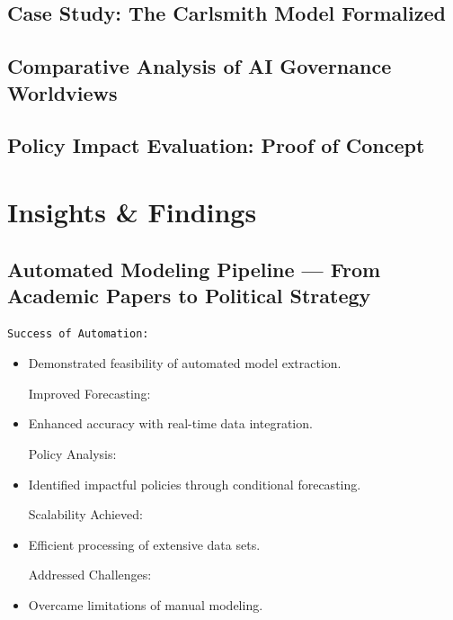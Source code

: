 \documentclass[
  letterpaper,
]{book}
\begin{document}
\subsection{Case Study: The Carlsmith Model
Formalized}\label{case-study-the-carlsmith-model-formalized}

\subsection{Comparative Analysis of AI Governance
Worldviews}\label{comparative-analysis-of-ai-governance-worldviews}

\subsection{Policy Impact Evaluation: Proof of
Concept}\label{policy-impact-evaluation-proof-of-concept}

\section{Insights \& Findings}\label{insights-findings}

\subsection{Automated Modeling Pipeline --- From Academic Papers to
Political
Strategy}\label{automated-modeling-pipeline-from-academic-papers-to-political-strategy}

\begin{verbatim}
Success of Automation:
\end{verbatim}

\begin{itemize}
\item
  Demonstrated feasibility of automated model extraction.

  Improved Forecasting:
\item
  Enhanced accuracy with real-time data integration.

  Policy Analysis:
\item
  Identified impactful policies through conditional forecasting.

  Scalability Achieved:
\item
  Efficient processing of extensive data sets.

  Addressed Challenges:
\item
  Overcame limitations of manual modeling.
\end{itemize}
\end{document}
